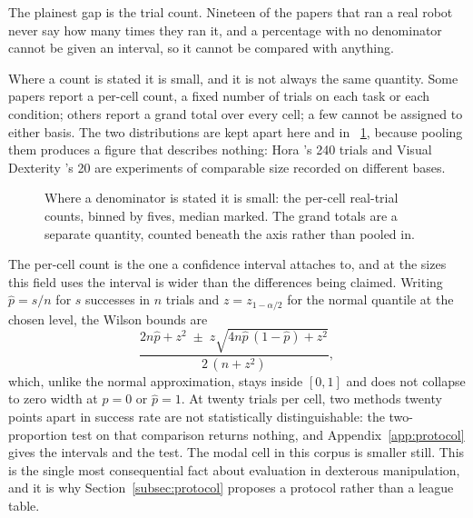 The plainest gap is the trial count. Nineteen of the papers that ran a real robot never say how
many times they ran it, and a percentage with no denominator cannot be given an interval, so it
cannot be compared with anything.

Where a count is stated it is small, and it is not always the same quantity. Some papers report a
per-cell count, a fixed number of trials on each task or each condition; others report a grand
total over every cell; a few cannot be assigned to either basis. The two distributions are kept
apart here and in \figurename~\ref{fig:trials}, because pooling them produces a figure that
describes nothing: Hora \cite{hora_2022}'s 240 trials and Visual Dexterity
\cite{visual_dexterity_2022}'s 20 are experiments of comparable size recorded on different bases.

\begin{figure}[!t]
  \centering
  \caption{Where a denominator is stated it is small: the \fnTrials{} per-cell real-trial counts,
  binned by fives, median \fnTrialsMedian{} marked. The \fnTotals{} grand totals are a separate
  quantity, counted beneath the axis rather than pooled in.}
  \label{fig:trials}
\end{figure}

The per-cell count is the one a confidence interval attaches to, and at the sizes this field
uses the interval is wider than the differences being claimed. Writing $\hat{p} = s/n$ for $s$
successes in $n$ trials and $z = z_{1-\alpha/2}$ for the normal quantile at the chosen level, the
Wilson bounds are \begin{equation} \frac{2n\hat{p} + z^{2} \;\pm\;
z\sqrt{4n\hat{p}\,(1-\hat{p}) + z^{2}}}{2\,(n + z^{2})}, \label{eq:wilson} \end{equation} which,
unlike the normal approximation, stays inside $[0,1]$ and does not collapse to zero width at
$\hat{p} = 0$ or $\hat{p} = 1$. At twenty trials per cell, two methods twenty points apart in
success rate are not statistically distinguishable: the two-proportion test on that comparison
returns nothing, and Appendix~\ref{app:protocol} gives the intervals and the test. The modal cell
in this corpus is smaller still. This is the single most consequential fact about evaluation in
dexterous manipulation, and it is why Section~\ref{subsec:protocol} proposes a protocol rather
than a league table.

